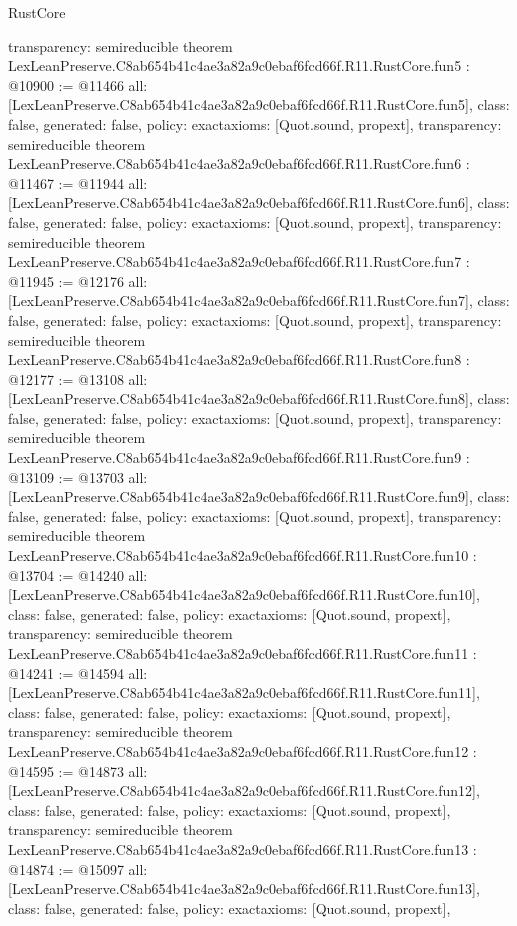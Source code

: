 \begin{lexlean}{RustCore}
\begin{coremodule}
{  transparency: semireducible
}
theorem LexLeanPreserve.C8ab654b41c4ae3a82a9c0ebaf6fcd66f.R11.RustCore.fun5 : @10900 := @11466 {
  all: [LexLeanPreserve.C8ab654b41c4ae3a82a9c0ebaf6fcd66f.R11.RustCore.fun5],
  class: false,
  generated: false,
  policy: exact{axioms: [Quot.sound, propext]},
  transparency: semireducible
}
theorem LexLeanPreserve.C8ab654b41c4ae3a82a9c0ebaf6fcd66f.R11.RustCore.fun6 : @11467 := @11944 {
  all: [LexLeanPreserve.C8ab654b41c4ae3a82a9c0ebaf6fcd66f.R11.RustCore.fun6],
  class: false,
  generated: false,
  policy: exact{axioms: [Quot.sound, propext]},
  transparency: semireducible
}
theorem LexLeanPreserve.C8ab654b41c4ae3a82a9c0ebaf6fcd66f.R11.RustCore.fun7 : @11945 := @12176 {
  all: [LexLeanPreserve.C8ab654b41c4ae3a82a9c0ebaf6fcd66f.R11.RustCore.fun7],
  class: false,
  generated: false,
  policy: exact{axioms: [Quot.sound, propext]},
  transparency: semireducible
}
theorem LexLeanPreserve.C8ab654b41c4ae3a82a9c0ebaf6fcd66f.R11.RustCore.fun8 : @12177 := @13108 {
  all: [LexLeanPreserve.C8ab654b41c4ae3a82a9c0ebaf6fcd66f.R11.RustCore.fun8],
  class: false,
  generated: false,
  policy: exact{axioms: [Quot.sound, propext]},
  transparency: semireducible
}
theorem LexLeanPreserve.C8ab654b41c4ae3a82a9c0ebaf6fcd66f.R11.RustCore.fun9 : @13109 := @13703 {
  all: [LexLeanPreserve.C8ab654b41c4ae3a82a9c0ebaf6fcd66f.R11.RustCore.fun9],
  class: false,
  generated: false,
  policy: exact{axioms: [Quot.sound, propext]},
  transparency: semireducible
}
theorem LexLeanPreserve.C8ab654b41c4ae3a82a9c0ebaf6fcd66f.R11.RustCore.fun10 : @13704 := @14240 {
  all: [LexLeanPreserve.C8ab654b41c4ae3a82a9c0ebaf6fcd66f.R11.RustCore.fun10],
  class: false,
  generated: false,
  policy: exact{axioms: [Quot.sound, propext]},
  transparency: semireducible
}
theorem LexLeanPreserve.C8ab654b41c4ae3a82a9c0ebaf6fcd66f.R11.RustCore.fun11 : @14241 := @14594 {
  all: [LexLeanPreserve.C8ab654b41c4ae3a82a9c0ebaf6fcd66f.R11.RustCore.fun11],
  class: false,
  generated: false,
  policy: exact{axioms: [Quot.sound, propext]},
  transparency: semireducible
}
theorem LexLeanPreserve.C8ab654b41c4ae3a82a9c0ebaf6fcd66f.R11.RustCore.fun12 : @14595 := @14873 {
  all: [LexLeanPreserve.C8ab654b41c4ae3a82a9c0ebaf6fcd66f.R11.RustCore.fun12],
  class: false,
  generated: false,
  policy: exact{axioms: [Quot.sound, propext]},
  transparency: semireducible
}
theorem LexLeanPreserve.C8ab654b41c4ae3a82a9c0ebaf6fcd66f.R11.RustCore.fun13 : @14874 := @15097 {
  all: [LexLeanPreserve.C8ab654b41c4ae3a82a9c0ebaf6fcd66f.R11.RustCore.fun13],
  class: false,
  generated: false,
  policy: exact{axioms: [Quot.sound, propext]},
}
\end{coremodule}
\end{lexlean}
